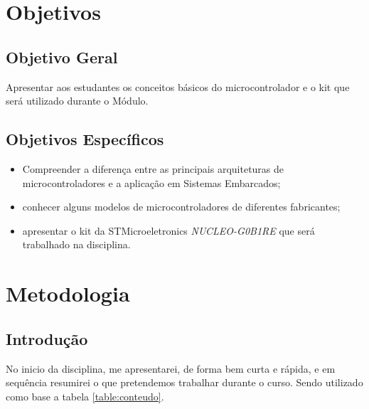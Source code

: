 \documentclass[12pt,a4paper]{report}
\begin{document}
\newpage

\chapter{Objetivos}

\section{Objetivo Geral}

Apresentar aos estudantes os conceitos básicos do microcontrolador e o kit que será utilizado durante o Módulo.

\section{Objetivos Específicos}

\begin{itemize}
    \item Compreender a diferença entre as principais arquiteturas de microcontroladores e a aplicação em Sistemas Embarcados;
    \item conhecer alguns modelos de microcontroladores de diferentes fabricantes;
    \item apresentar o kit da STMicroeletronics \textit{NUCLEO-G0B1RE} que será trabalhado na disciplina.
\end{itemize}


\chapter{Metodologia}

\section{Introdução}

No inicio da disciplina, me apresentarei, de forma bem curta e rápida, e em sequência resumirei o que pretendemos trabalhar durante o curso. Sendo utilizado como base a tabela \ref{table:conteudo}.
\end{document}
